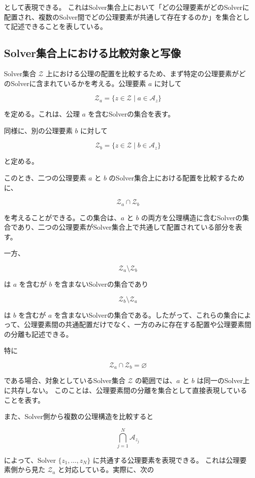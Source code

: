 として表現できる。
これはSolver集合上において「どの公理要素がどのSolverに配置され、複数のSolver間でどの公理要素が共通して存在するのか」を集合として記述できることを表している。

\subsection{Solver集合上における比較対象と写像}

Solver集合 $\mathcal{Z}$ 上における公理の配置を比較するため、まず特定の公理要素がどのSolverに含まれているかを考える。公理要素 $a$ に対して

\[
\mathcal{Z}_a = \{z\in\mathcal{Z}\mid a\in\mathcal{A}_z\}
\]

を定める。これは、公理 $a$ を含むSolverの集合を表す。

同様に、別の公理要素 $b$ に対して

\[
\mathcal{Z}_b = \{z\in\mathcal{Z}\mid b\in\mathcal{A}_z\}
\]

と定める。

このとき、二つの公理要素 $a$ と $b$ のSolver集合上における配置を比較するために、

\[
\mathcal{Z}_a\cap\mathcal{Z}_b
\]

を考えることができる。この集合は、$a$ と $b$ の両方を公理構造に含むSolverの集合であり、二つの公理要素がSolver集合上で共通して配置されている部分を表す。

一方、

\[
\mathcal{Z}_a\setminus\mathcal{Z}_b
\]

は $a$ を含むが $b$ を含まないSolverの集合であり

\[
\mathcal{Z}_b\setminus\mathcal{Z}_a
\]

は $b$ を含むが $a$ を含まないSolverの集合である。したがって、これらの集合によって、公理要素間の共通配置だけでなく、一方のみに存在する配置や公理要素間の分離も記述できる。

特に

\[
\mathcal{Z}_a\cap\mathcal{Z}_b=\varnothing
\]

である場合、対象としているSolver集合 $\mathcal{Z}$ の範囲では、$a$ と $b$ は同一のSolver上に共存しない。
このことは、公理要素間の分離を集合として直接表現していることを表す。

また、Solver側から複数の公理構造を比較すると

\[
\bigcap_{j=1}^{N}\mathcal{A}_{z_j}
\]

によって、Solver $\{z_1,\ldots,z_N\}$ に共通する公理要素を表現できる。
これは公理要素側から見た $\mathcal{Z}_a$ と対応している。実際に、次の

